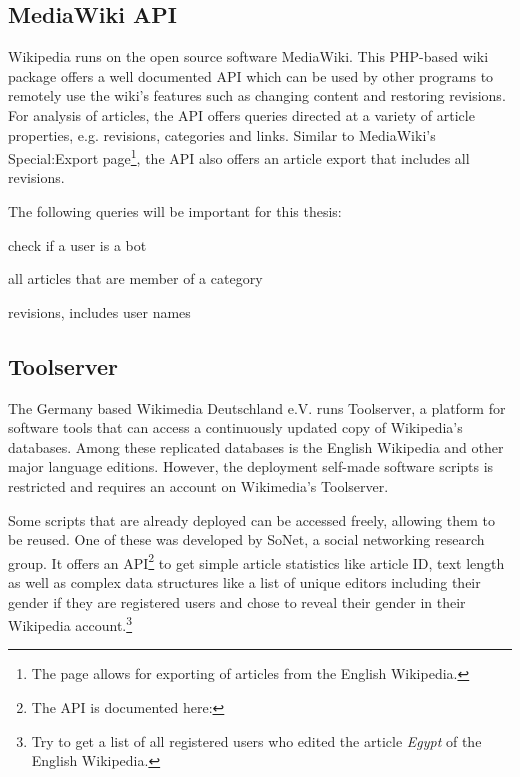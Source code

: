 \subsection{MediaWiki API}

Wikipedia runs on the open source software MediaWiki.
This PHP-based wiki package offers a well documented API which can be used by other programs to remotely use the wiki's features such as changing content and restoring revisions.
For analysis of articles, the API offers queries directed at a variety of article properties, e.g. revisions, categories and links.
Similar to MediaWiki's Special:Export page\footnote{The page  allows for exporting of articles from the English Wikipedia.}, the API also offers an article export that includes all revisions.

The following queries will be important for this thesis:

\begin{todos}
    \item check if a user is a bot 
    \item all articles that are member of a category
    \item revisions, includes user names
\end{todos}

\subsection{Toolserver}\label{sub:toolserver}

The Germany based Wikimedia Deutschland e.V. runs Toolserver, a platform for software tools that can access a continuously updated copy of Wikipedia's databases. 
Among these replicated databases is the English Wikipedia and other major language editions.
However, the deployment self-made software scripts is restricted and requires an account on Wikimedia's Toolserver.

Some scripts that are already deployed can be accessed freely, allowing them to be reused.
One of these was developed by SoNet, a social networking research group.
It offers an API\footnote{The API is documented here: } to get simple article statistics like article ID, text length as well as complex data structures like a list of unique editors including their gender if they are registered users and chose to reveal their gender in their Wikipedia account.\footnote{Try  to get a list of all registered users who edited the article \emph{Egypt} of the English Wikipedia.}


